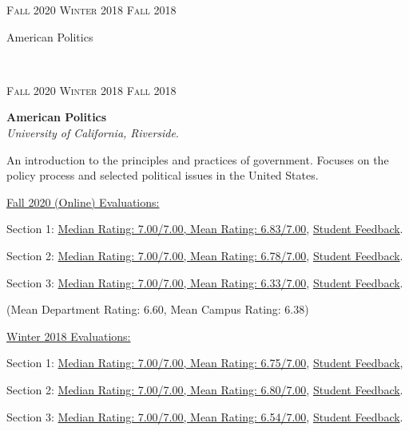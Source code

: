 \documentclass[letterpaper,10pt]{article}
\newcommand{\entry}[4]{
\ifthenelse{\isempty{#3}}
{\slimentry{#1}{#2}}{

\begin{minipage}[t]{.145\textwidth}
\flushright \textsc{#1}
\end{minipage}
\hfill\vline\hfill
\begin{minipage}[t]{.82\textwidth}
{\bf#2}\\\textit{#3}. \small{#4}
\end{minipage}\\
\vspace{.25cm}
}}
\newcommand{\slimentry}[2]{

\begin{minipage}[t]{.13\textwidth}
\hfill \textsc{#1}
\end{minipage}
\hfill\vline\hfill
\begin{minipage}[t]{.82\textwidth}
#2
\end{minipage}\\
}
\newcommand{\ucr}{University of California, Riverside}
\begin{document}
\entry{Fall 2020 Winter 2018 Fall 2018}
			{American Politics}
			{\ucr}
			{An introduction to the principles and practices of government. Focuses on the policy process and selected political issues in the United States.
			\begin{description}
				\item \underline{Fall 2020 (Online) Evaluations:}
				\item Section 1: \href{https://nrjenkins.github.io/nrjenkins.github.io/files/docs/teaching_evals/POSC010_Fall20_Section24_Scores.pdf}{Median Rating: 7.00/7.00, Mean Rating: 6.83/7.00}, \href{https://nrjenkins.github.io/nrjenkins.github.io/files/docs/teaching_evals/POSC010_Fall20_Section24_Comments.pdf}{Student Feedback}.
				\item Section 2: \href{https://nrjenkins.github.io/nrjenkins.github.io/files/docs/teaching_evals/POSC010_Fall20_Section26_Scores.pdf}{Median Rating: 7.00/7.00, Mean Rating: 6.78/7.00}, \href{https://nrjenkins.github.io/nrjenkins.github.io/files/docs/teaching_evals/POSC010_Fall20_Section26_Comments.pdf}{Student Feedback}.
				\item Section 3: \href{https://nrjenkins.github.io/nrjenkins.github.io/files/docs/teaching_evals/POSC010_Fall20_Section32_Scores.pdf}{Median Rating: 7.00/7.00, Mean Rating: 6.33/7.00}, \href{https://nrjenkins.github.io/nrjenkins.github.io/files/docs/teaching_evals/POSC010_Fall20_Section32_Comments.pdf}{Student Feedback}.
				\item (Mean Department Rating: 6.60, Mean Campus Rating: 6.38)
				\item \underline{Winter 2018 Evaluations:}
				\item Section 1: \href{https://nrjenkins.github.io/nrjenkins.github.io/files/docs/teaching_evals/POSC010_Winter19_Section24_Scores.pdf}{Median Rating: 7.00/7.00, Mean Rating: 6.75/7.00}, \href{https://nrjenkins.github.io/nrjenkins.github.io/files/docs/teaching_evals/POSC010_Winter19_Section24_Comments.pdf}{Student Feedback},
				\item Section 2: \href{https://nrjenkins.github.io/nrjenkins.github.io/files/docs/teaching_evals/POSC010_Winter19_Section25_Scores.pdf}{Median Rating: 7.00/7.00, Mean Rating: 6.80/7.00}, \href{https://nrjenkins.github.io/nrjenkins.github.io/files/docs/teaching_evals/POSC010_Winter19_Section25_Comments.pdf}{Student Feedback}.
				\item Section 3: \href{https://nrjenkins.github.io/nrjenkins.github.io/files/docs/teaching_evals/POSC010_Winter19_Section26_Scores.pdf}{Median Rating: 7.00/7.00, Mean Rating: 6.54/7.00}, \href{https://nrjenkins.github.io/nrjenkins.github.io/files/docs/teaching_evals/POSC010_Winter19_Section26_Comments.pdf}{Student Feedback}.

\end{description}}
\end{document}
